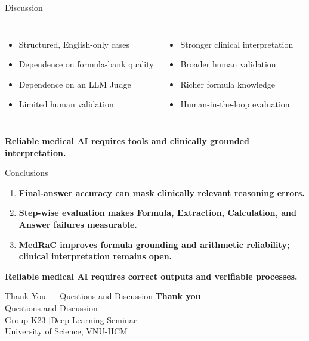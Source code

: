 \begin{frame}{Discussion}
  \vspace{0.16cm}
  \begin{columns}[T,onlytextwidth]
      \par\vspace{0.10cm}
      \begin{itemize}
        \item Structured, English-only cases
        \item Dependence on formula-bank quality
        \item Dependence on an LLM Judge
        \item Limited human validation
      \end{itemize}
      \par\vspace{0.10cm}
      \begin{itemize}
        \item Stronger clinical interpretation
        \item Broader human validation
        \item Richer formula knowledge
        \item Human-in-the-loop evaluation
      \end{itemize}
  \end{columns}
  \vfill
  \centering
  {\large\bfseries\color{DeepBlue}Reliable medical AI requires tools and clinically grounded interpretation.}
\end{frame}

\begin{frame}{Conclusions}
  \vspace{0.20cm}
  \begin{enumerate}
    \item \textbf{Final-answer accuracy can mask clinically relevant reasoning errors.}
    \vspace{0.20cm}
    \item \textbf{Step-wise evaluation makes Formula, Extraction, Calculation, and Answer failures measurable.}
    \vspace{0.20cm}
    \item \textbf{MedRaC improves formula grounding and arithmetic reliability; clinical interpretation remains open.}
  \end{enumerate}
  \vfill
  \centering
  {\Large\bfseries\color{DeepBlue}Reliable medical AI requires correct outputs and verifiable processes.}
\end{frame}

\begin{frame}{Thank You --- Questions and Discussion}
  \vfill
  \centering
  {\Large\bfseries\color{DeepBlue}Thank you}\\[0.24cm]
  {\large Questions and Discussion}\\[0.42cm]
  {\small Group K23 \enspace|\enspace Deep Learning Seminar\\University of Science, VNU-HCM}
  \vfill
\end{frame}
